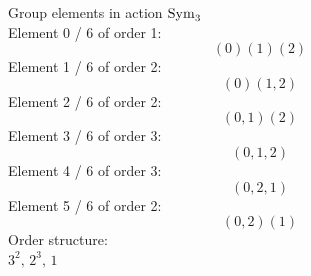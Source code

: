 Group elements in action ${\rm Sym}_{3}$\\
Element     0 / 6 of order 1:
$$
(0)(1)(2)$$
Element     1 / 6 of order 2:
$$
(0)(1, 2)$$
Element     2 / 6 of order 2:
$$
(0, 1)(2)$$
Element     3 / 6 of order 3:
$$
(0, 1, 2)$$
Element     4 / 6 of order 3:
$$
(0, 2, 1)$$
Element     5 / 6 of order 2:
$$
(0, 2)(1)$$
Order structure:\\
$
3^2,\, 2^3,\, 1 $
\\

